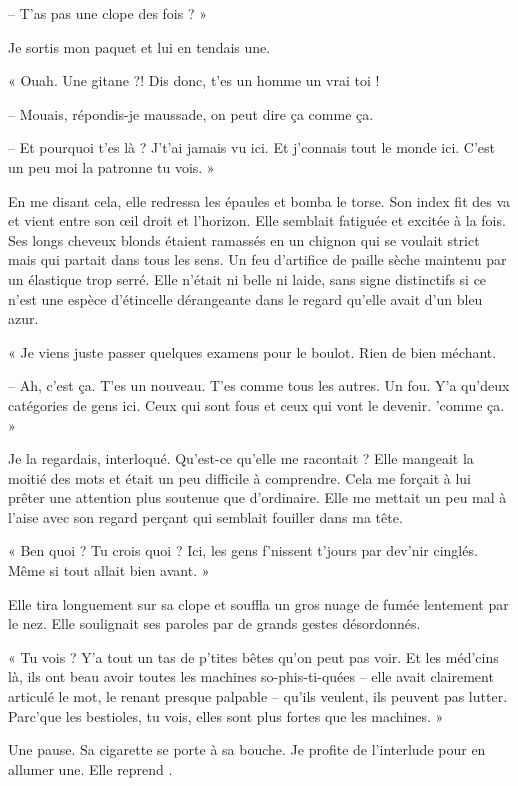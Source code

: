 -- T'as pas une clope des fois ? »

Je sortis mon paquet et lui en tendais une.

« Ouah. Une gitane ?! Dis donc, t'es un homme un vrai toi !

-- Mouais, répondis-je maussade, on peut dire ça comme ça.

-- Et pourquoi t'es là ? J't'ai jamais vu ici. Et j'connais tout le monde ici. C'est un peu moi la patronne tu vois. »

En me disant cela, elle redressa les épaules et bomba le torse. Son index fit des va et vient entre son œil droit et 
l'horizon. Elle semblait fatiguée et excitée à la fois. Ses longs cheveux blonds étaient ramassés en un chignon qui se 
voulait strict mais qui partait dans tous les sens. Un feu d'artifice de paille sèche maintenu par un élastique trop 
serré. Elle n'était ni belle ni laide, sans signe distinctifs si ce n'est une espèce d'étincelle dérangeante dans le 
regard qu'elle avait d'un bleu azur.

« Je viens juste passer quelques examens pour le boulot. Rien de bien méchant.

-- Ah, c'est ça. T'es un nouveau. T'es comme tous les autres. Un fou. Y'a qu'deux catégories de gens ici. Ceux qui sont 
fous et ceux qui vont le devenir. 'comme ça. »

Je la regardais, interloqué. Qu'est-ce qu'elle me racontait ? Elle mangeait la moitié des mots et était un peu 
difficile à comprendre. Cela me forçait à lui prêter une attention plus soutenue que d'ordinaire. Elle me mettait un 
peu mal à l'aise avec son regard perçant qui semblait fouiller dans ma tête.

« Ben quoi ? Tu crois quoi ? Ici, les gens f'nissent t'jours par dev'nir cinglés. Même si tout allait bien avant. »

Elle tira longuement sur sa clope et souffla un gros nuage de fumée lentement par le nez. Elle soulignait ses paroles 
par de grands gestes désordonnés.

« Tu vois ? Y'a tout un tas de p'tites bêtes qu'on peut pas voir. Et les méd'cins là, ils ont beau avoir toutes les 
machines so-phis-ti-quées -- elle avait clairement articulé le mot, le renant presque palpable -- qu'ils veulent, ils 
peuvent pas lutter. Parc'que les bestioles, tu vois, elles sont plus fortes que les machines. »

Une pause. Sa cigarette se porte à sa bouche. Je profite de l'interlude pour en allumer une. Elle reprend .

